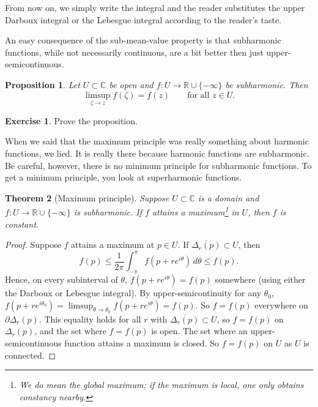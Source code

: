 \documentclass[12pt,openany]{book}
\newcommand{\C}{{\mathbb{C}}}
\newcommand{\R}{{\mathbb{R}}}
\theoremstyle{plain}
\newtheorem{thm}{Theorem}[section]
\newtheorem{prop}[thm]{Proposition}
\theoremstyle{remark}
\theoremstyle{definition}
\newenvironment{exbox}{%
    \def\FrameCommand{\vrule width 1pt \relax\hspace{10pt}}%
    \MakeFramed{\advance\hsize-\width\FrameRestore}%
}{%
    \endMakeFramed
}
\theoremstyle{exercise}
\newtheorem{exercise}{Exercise}[section]
\theoremstyle{example}
\begin{document}
From now on, we simply write the integral and
the reader substitutes the upper Darboux integral or the Lebesgue integral
according to the reader's taste.

An easy consequence of the sub-mean-value property is that subharmonic
functions, while not necessarily continuous, are a bit better then just
upper-semicontinuous.

\begin{prop}
Let $U \subset \C$ be open and
$f \colon U \to \R \cup\{- \infty \}$ be subharmonic.
Then 
\begin{equation*}
\limsup_{\zeta \to z} f(\zeta) = f(z) 
\qquad \text{for all $z \in U$.}
\end{equation*}
\end{prop}

\begin{exbox}
\begin{exercise}
Prove the proposition.
\end{exercise}
\end{exbox}

When we said that the maximum principle was really something about harmonic
functions, we lied.  It is really there because harmonic functions are
subharmonic.  Be careful, however, there is no minimum principle for
subharmonic functions.  To get a minimum principle, you look at superharmonic
functions.

\begin{thm}[Maximum principle]
Suppose $U \subset \C$ is a domain and $f \colon U \to \R \cup \{ -\infty \}$
is subharmonic.  If $f$ attains a maximum\footnote{%
We do mean the global maximum; if the maximum is local, one only
obtains constancy nearby.}
in $U$, then $f$ is constant.
\end{thm}

\begin{proof}
Suppose $f$ attains a maximum at $p \in U$.
If
$\overline{\Delta_r(p)} \subset U$, then
\begin{equation*}
f(p) \leq \frac{1}{2\pi} \int_{-\pi}^{\pi} f(p+re^{i\theta})\, d\theta \leq f(p)
.
\end{equation*}
Hence, on every subinterval of $\theta$, $f(p+re^{i\theta}) = f(p)$
somewhere (using either the Darboux or Lebesgue integral).
By upper-semicontinuity for any $\theta_0$,
$f(p+re^{i\theta_0}) = \limsup_{\theta \to \theta_0} f(p+re^{i\theta}) =
f(p)$.  So $f = f(p)$ everywhere on $\partial \Delta_r(p)$.
This equality holds for all $r$
with $\overline{\Delta_r(p)} \subset U$, so $f=f(p)$ on $\Delta_r(p)$,
and the set where $f=f(p)$ is open.  The set where an upper-semicontinuous
function attains a maximum is closed.  So $f=f(p)$ on $U$ as $U$ is
connected.
\end{proof}
\end{document}
